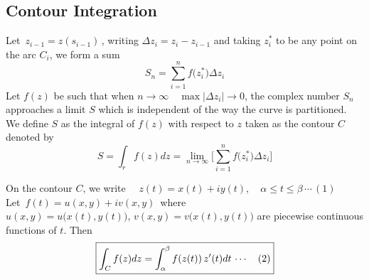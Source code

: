 \documentclass[11pt,a4paper]{article}
\theoremstyle{definition}
\begin{document}
{\color[wave]{485}\subsection{Contour Integration}}


\begin{figure}[H]
\centering
{}
\end{figure}











Let $\, z_{i-1} = z(s_{i-1})\,$, writing $\Delta z_i = z_i - z_{i-1}$ and taking $z_i^*$ to be any point on the arc $C_i$, we form a sum $$S_n = \sum^n_{i=1} f\big(z^*_i\big)\Delta z_i$$
Let $f(z)$ be such that when $n\longrightarrow \infty\quad \max\left|\Delta z_i\right| \longrightarrow 0$, the complex number $S_n$ approaches a limit $S$ which is independent of the way the curve is partitioned.\\

We define $S$ as the integral of $f(z)$ with respect to $z$ taken as the  contour $C$ denoted by
$$S  = \int_r f(z)dz = \lim\limits_{n \rightarrow \infty} \Bigg[\sum^n_{i = 1} f\big(z^*_i\big)\Delta z_i \Bigg]$$


On the contour $C$, we write $\quad z(t) = x(t) + iy(t),\quad  \alpha \leq t\leq \beta\,\cdots\,(1)$\\
Let $\,f(t) = u(x,y) + iv(x,y)\,$ where $u(x,y) = u\big(x(t), y(t)\big),\, v(x,y) = v\big(x(t), y(t)\big)$ are piecewise continuous functions of $t$. Then 
$$\boxed{\int_Cf(z) dz = \int^{\beta}_{\alpha} f(z(t))\,z'(t)dt\,\cdots\quad (2)\\}$$
\end{document}
